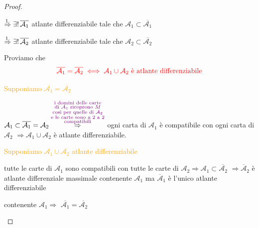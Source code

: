 \begin{proof}
\begin{enumerate}
            $\overset{\textcolor{black}{1.}}{\Rightarrow} \exists ! \, \overline{\mathcal{A}_{1}}$ atlante differenziabile tale che ${\mathcal{A}}_{1} \subset \overline{\mathcal{A}_1}$

            $\overset{\textcolor{black}{1.}}{\Rightarrow} \exists ! \, \overline{\mathcal{A}_{2}}$ atlante differenziabile tale che ${\mathcal{A}}_{2} \subset \overline{\mathcal{A}_2}$
            
            Proviamo che 
            \[ \color{red} \overline{\mathcal{A}_1} = \overline{\mathcal{A}_2} \iff \mathcal{A}_1 \cup \mathcal{A}_2 \text{ è atlante differenziabile} \]

            \textcolor{orange}{Supponiamo  $\overline{\mathcal{A}_1} = \overline{\mathcal{A}_2}$}

            $\mathcal{A}_1 \subset \overline{\mathcal{A}_1} = \mathcal{A}_2 \overset{\textcolor{violet}{\substack{\text{i domini delle carte} \\ \text{di } \mathcal{A}_1 \text{ ricoprono } M \\
            \text{così per quelle di } \mathcal{A}_2 \\ \text{e le carte sono a } 2 \text{ a } 2 \\ \text{compatibili}}}}{\Rightarrow}$ ogni carta di $\mathcal{A}_1$ è compatibile con ogni carta di $\mathcal{A}_2$
            $\Rightarrow \mathcal{A}_1 \cup \mathcal{A}_2$ è atlante differenziabile.

            \textcolor{orange}{Supponiamo  $\mathcal{A}_1 \cup \mathcal{A}_2$ atlante differenziabile}

            tutte le carte di $\mathcal{A}_1$ sono compatibili con tutte le carte di $\mathcal{A}_2 \Rightarrow \mathcal{A}_1 \subset \overline{\mathcal{A}_2}$
            $\Rightarrow \overline{\mathcal{A}}_2$ è atlante differenziale massimale contenente $\mathcal{A}_1$ ma $\overline{\mathcal{A}}_1$ è l'unico atlante differenziabile
            
            contenente $\mathcal{A}_1 \Rightarrow$ $\overline{\mathcal{A}_1} = \overline{\mathcal{A}_2}$
        \end{enumerate}
        \end{proof}
